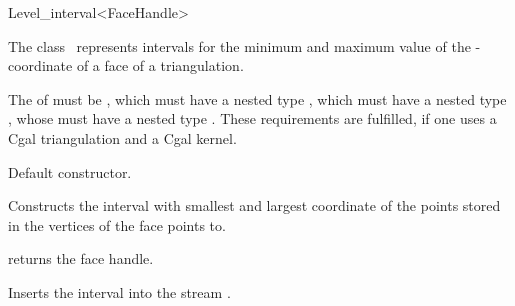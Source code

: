 \begin{ccRefClass} {Level_interval<FaceHandle>}

\ccDefinition

The class \ccClassTemplateName\ represents intervals for the minimum and
maximum value of the -coordinate of a face of a triangulation.




\ccThreeToTwo



\ccRequirements
The  of   must be , which must have a 
nested type , which must have a nested type ,
whose  must have a nested type .
These requirements are fulfilled, if one uses a {\sc Cgal} triangulation
and a {\sc Cgal} kernel.

\ccTypes


\ccCreation
{}

{Default constructor.}

{Constructs the interval with smallest and largest  coordinate of the points
stored in the vertices of the face  points to.}

\ccOperations


{returns the face handle.}


{Inserts the interval  into the stream .
}

\ccIsModel
{}

\end{ccRefClass}

